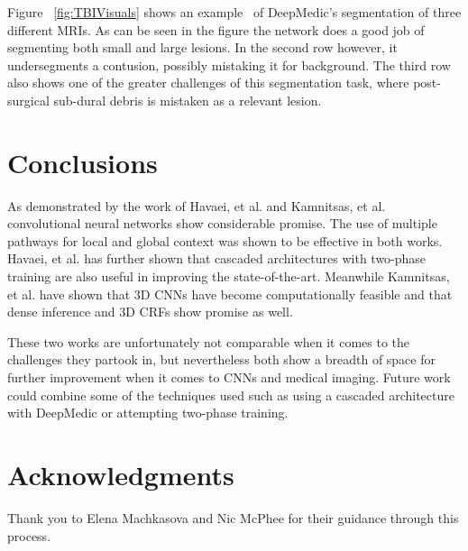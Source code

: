 \documentclass{sig-alternate}
\begin{document}
Figure ~\ref{fig:TBIVisuals} shows an example~\cite{Kamnitsas:2017} of DeepMedic's segmentation of three different MRIs. As can be seen in the figure the network does a good job of segmenting both small and large lesions. In the second row however, it undersegments a contusion, possibly mistaking it for background. The third row also shows one of the greater challenges of this segmentation task, where post-surgical sub-dural debris is mistaken as a relevant lesion.~\cite{Kamnitsas:2017}

\section{Conclusions}
\label{sec:conclusions}

As demonstrated by the work of Havaei, et al. and Kamnitsas, et al. convolutional neural networks show considerable promise. The use of multiple pathways for local and global context was shown to be effective in both works. Havaei, et al. has further shown that cascaded architectures with two-phase training are also useful in improving the state-of-the-art. Meanwhile Kamnitsas, et al. have shown that 3D CNNs have become computationally feasible and that dense inference and 3D CRFs show promise as well.

These two works are unfortunately not comparable when it comes to the challenges they partook in, but nevertheless both show a breadth of space for further improvement when it comes to CNNs and medical imaging. Future work could combine some of the techniques used such as using a cascaded architecture with DeepMedic or attempting two-phase training.


\section*{Acknowledgments}
\label{sec:acknowledgments}

Thank you to Elena Machkasova and Nic McPhee for their guidance through this process.


  
\end{document}
